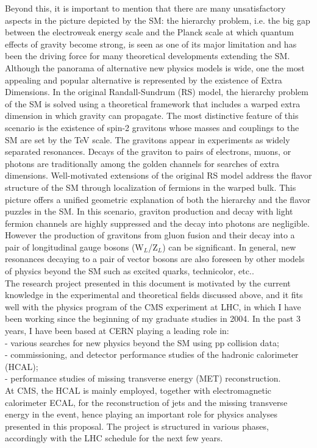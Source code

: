 \documentclass[10pt, a4paper]{article}
\begin{document}
Beyond this, it is important to mention that there are many unsatisfactory 
aspects in the picture depicted by the SM: the hierarchy problem, i.e. the big 
gap between the electroweak energy scale and the Planck scale at which 
quantum effects of gravity become strong, is seen as one of its major limitation 
and has been the driving force for many theoretical developments extending the 
SM. Although the panorama of alternative new physics models is wide, one the 
most appealing and popular alternative is represented by the existence of Extra Dimensions. 
In the original Randall-Sundrum (RS) model, the hierarchy problem
of the SM is solved using a theoretical framework that includes a warped extra dimension
in which gravity can propagate. 
The most distinctive feature of this scenario is the existence of spin-2 gravitons
whose masses and couplings to the SM are set by the TeV scale. The gravitons 
appear in experiments as widely separated resonances. 
Decays of the graviton to pairs of electrons, muons, or photons are traditionally among 
the golden channels for searches of extra dimensions.
Well-motivated extensions of the original RS model address the flavor structure of the SM through 
localization of fermions in the warped bulk. This picture offers a unified geometric explanation 
of both the hierarchy and the flavor puzzles in the SM.
In this scenario, graviton production and decay with light fermion channels are 
highly suppressed and the decay into photons are negligible. 
However the production of gravitons from gluon fusion and 
their decay into a pair of longitudinal gauge bosons (W$_L$/Z$_L$) can be significant.
In general, new resonances decaying to a pair of vector bosons 
are also foreseen by other models of physics beyond the SM such as 
excited quarks, technicolor, etc.. \\

The research project presented in this document 
is motivated by the current knowledge in the experimental and 
theoretical fields discussed above, and it fits well with 
the physics program of the CMS experiment at LHC, in which 
I have been working since the beginning of my graduate studies in 2004.
In the past 3 years, I have been based at CERN playing a leading role in: \\ 
- various searches for new physics beyond the SM using pp collision data;\\
- commissioning, and detector performance studies of the hadronic calorimeter (HCAL); \\
- performance studies of missing transverse energy (MET) reconstruction. \\
At CMS, the HCAL is mainly employed, together 
with electromagnetic calorimeter ECAL, for the reconstruction 
of jets and the missing transverse energy in the event, 
hence playing an important role for physics analyses presented in this proposal.
The project is structured in various phases, accordingly with the 
LHC schedule for the next few years.\\
\end{document}

